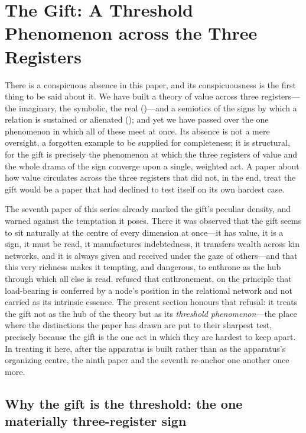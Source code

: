 \section{The Gift: A Threshold Phenomenon across the Three Registers}
\label{p09:sec:gift}

\noindent
There is a conspicuous absence in this paper, and its conspicuousness is the first thing to be said about it. We have built a theory of value across three registers---the imaginary, the symbolic, the real ()---and a semiotics of the signs by which a relation is sustained or alienated (); and yet we have passed over the one phenomenon in which all of these meet at once.  Its absence is not a mere oversight, a forgotten example to be supplied for completeness; it is structural, for the gift is precisely the phenomenon at which the three registers of value and the whole drama of the sign converge upon a single, weighted act. A paper about how value circulates across the three registers that did not, in the end, treat the gift would be a paper that had declined to test itself on its own hardest case.

The seventh paper of this series already marked the gift's peculiar density, and warned against the temptation it poses. There it was observed that the gift seems to sit naturally at the centre of every dimension at once---it has value, it is a sign, it must be read, it manufactures indebtedness, it transfers wealth across kin networks, and it is always given and received under the gaze of others---and that this very richness makes it tempting, and dangerous, to enthrone as the hub through which all else is read.  refused that enthronement, on the principle that load-bearing is conferred by a node's position in the relational network and not carried as its intrinsic essence. The present section honours that refusal: it treats the gift not as the hub of the theory but as its \emph{threshold phenomenon}---the place where the distinctions the paper has drawn are put to their sharpest test, precisely because the gift is the one act in which they are hardest to keep apart. In treating it here, after the apparatus is built rather than as the apparatus's organizing centre, the ninth paper and the seventh re-anchor one another once more.

\subsection{Why the gift is the threshold: the one materially three-register sign}
\label{p09:sec:gift-threshold}

